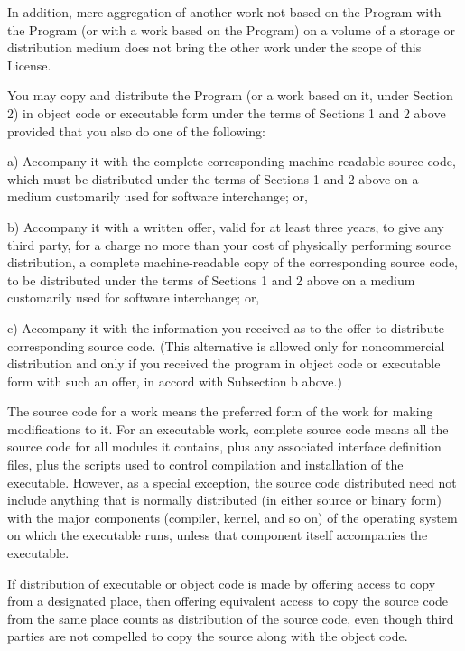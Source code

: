 In addition, mere aggregation of another work not based on the Program with the Program (or with a work based on the Program) on a volume of a storage or distribution medium does not bring the other work under the scope of this License.


\begin{DoxyEnumerate}
\item You may copy and distribute the Program (or a work based on it, under Section 2) in object code or executable form under the terms of Sections 1 and 2 above provided that you also do one of the following\-: \begin{DoxyVerb}a) Accompany it with the complete corresponding machine-readable
source code, which must be distributed under the terms of Sections
1 and 2 above on a medium customarily used for software interchange; or,

b) Accompany it with a written offer, valid for at least three
years, to give any third party, for a charge no more than your
cost of physically performing source distribution, a complete
machine-readable copy of the corresponding source code, to be
distributed under the terms of Sections 1 and 2 above on a medium
customarily used for software interchange; or,

c) Accompany it with the information you received as to the offer
to distribute corresponding source code.  (This alternative is
allowed only for noncommercial distribution and only if you
received the program in object code or executable form with such
an offer, in accord with Subsection b above.)
\end{DoxyVerb}

\end{DoxyEnumerate}

The source code for a work means the preferred form of the work for making modifications to it. For an executable work, complete source code means all the source code for all modules it contains, plus any associated interface definition files, plus the scripts used to control compilation and installation of the executable. However, as a special exception, the source code distributed need not include anything that is normally distributed (in either source or binary form) with the major components (compiler, kernel, and so on) of the operating system on which the executable runs, unless that component itself accompanies the executable.

If distribution of executable or object code is made by offering access to copy from a designated place, then offering equivalent access to copy the source code from the same place counts as distribution of the source code, even though third parties are not compelled to copy the source along with the object code.


